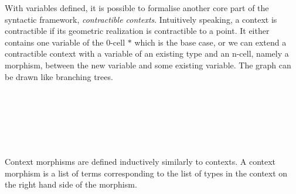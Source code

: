 \documentclass{acm_proc_article-sp}
\begin{document}
With variables defined, it is possible to formalise another core part of the syntactic framework, \emph{contractible
contexts}. Intuitively speaking, a context is contractible if its geometric
realization is contractible to a point. It either contains one variable of the 0-cell $*$ which is the base case, or we can extend a contractible context with a
variable of an existing type and an n-cell, namely a morphism, between the new variable and some existing variable. The graph can be drawn like branching trees.

\begin{code}\>\<%
\\
\>  \<%
\\
\>[0]\<[2]%
\>[2] \<[7]%
\>[7]\AgdaSymbol{:}  \AgdaSymbol{(} \AgdaInductiveConstructor{,} \AgdaInductiveConstructor{*}\AgdaSymbol{)}\<%
\\
\>[0]\<[2]%
\>[2] \<[7]%
\>[7]\AgdaSymbol{:} \AgdaSymbol{\}}     \AgdaSymbol{\{} \AgdaSymbol{:}  \AgdaSymbol{\}(} \AgdaSymbol{:}  \AgdaSymbol{)} \<[50]%
\>[50]\<%
\\
\>[2]\<[7]%
\>[7]  \AgdaSymbol{(} \AgdaInductiveConstructor{,}  \AgdaInductiveConstructor{,} \AgdaSymbol{(} \AgdaSymbol{(} \AgdaSymbol{)}   \AgdaSymbol{))} \<[54]%
\>[54]\<%
\\
\>\<\end{code}
Context morphisms are defined inductively similarly to contexts. A context morphism is a list of terms corresponding to the list of types in the context on the right hand side of the morphism.
\end{document}
